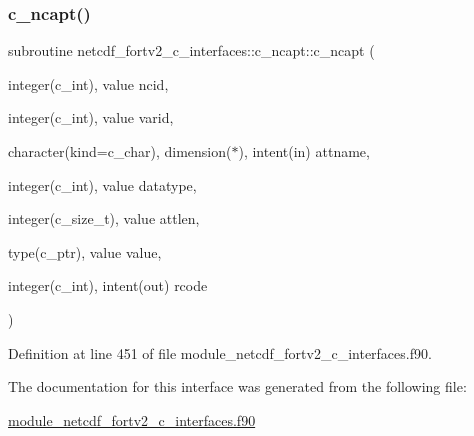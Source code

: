 \subsubsection{\texorpdfstring{c\+\_\+ncapt()}{c\_ncapt()}}
{\footnotesize\ttfamily subroutine netcdf\+\_\+fortv2\+\_\+c\+\_\+interfaces\+::c\+\_\+ncapt\+::c\+\_\+ncapt (\begin{DoxyParamCaption}\item[{integer(c\+\_\+int), value}]{ncid,  }\item[{integer(c\+\_\+int), value}]{varid,  }\item[{character(kind=c\+\_\+char), dimension($\ast$), intent(in)}]{attname,  }\item[{integer(c\+\_\+int), value}]{datatype,  }\item[{integer(c\+\_\+size\+\_\+t), value}]{attlen,  }\item[{type(c\+\_\+ptr), value}]{value,  }\item[{integer(c\+\_\+int), intent(out)}]{rcode }\end{DoxyParamCaption})}



Definition at line 451 of file module\+\_\+netcdf\+\_\+fortv2\+\_\+c\+\_\+interfaces.\+f90.



The documentation for this interface was generated from the following file\+:\begin{DoxyCompactItemize}
\item 
\hyperlink{module__netcdf__fortv2__c__interfaces_8f90}{module\+\_\+netcdf\+\_\+fortv2\+\_\+c\+\_\+interfaces.\+f90}\end{DoxyCompactItemize}
